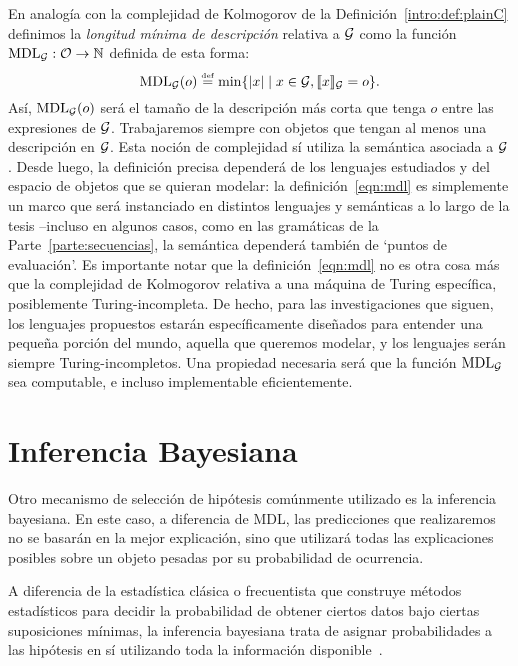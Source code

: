 En analogía con la complejidad de Kolmogorov de la Definición~\ref{intro:def:plainC} definimos la {\em longitud mínima de descripción} relativa a $\gram$ como la función $\mdl{\gram}:\+O\to\nat$ definida de esta forma:
%
\begin{equation}\label{eqn:mdl}
\mdl{\gram}(o)\eqdef\min\{|x|\mid x\in\gram,\sem{x}_{\gram}=o\}.
\end{equation}
%
Así, $\mdl{\gram}(o)$ será el tamaño de la descripción más corta que tenga $o$ entre las expresiones de $\gram$. Trabajaremos siempre con objetos que tengan al menos una descripción en $\gram$. Esta noción de complejidad sí utiliza la semántica asociada a $\gram$. Desde luego, la definición precisa dependerá de los lenguajes estudiados y del espacio de objetos que se quieran modelar: la definición~\eqref{eqn:mdl} es simplemente un marco que será instanciado en distintos lenguajes y semánticas a lo largo de la tesis --incluso en algunos casos, como en las gramáticas de la Parte~\ref{parte:secuencias}, la semántica dependerá también de `puntos de evaluación'. Es importante notar que la definición~\eqref{eqn:mdl} no es otra cosa más que la complejidad de Kolmogorov relativa a una máquina de Turing específica, posiblemente Turing-incompleta. De hecho, para las investigaciones que siguen, los lenguajes propuestos estarán específicamente diseñados para entender una pequeña porción del mundo, aquella que queremos modelar, y los lenguajes serán siempre Turing-incompletos. Una propiedad necesaria será que la función $\mdl{\gram}$ sea computable, e incluso implementable eficientemente.





\section{Inferencia Bayesiana}\label{sec:bayes}
Otro mecanismo de selección de hipótesis comúnmente utilizado es la inferencia bayesiana. En este caso, a diferencia de MDL, las predicciones que realizaremos no se basarán en la mejor explicación, sino que utilizará todas las explicaciones posibles sobre un objeto pesadas por su probabilidad de ocurrencia. 

A diferencia de la estadística clásica o frecuentista que construye métodos estadísticos para decidir la probabilidad de obtener ciertos datos bajo ciertas suposiciones mínimas, la inferencia bayesiana trata de asignar probabilidades a las hipótesis en sí utilizando toda la información disponible~\cite{carlin2008bayesian}.

